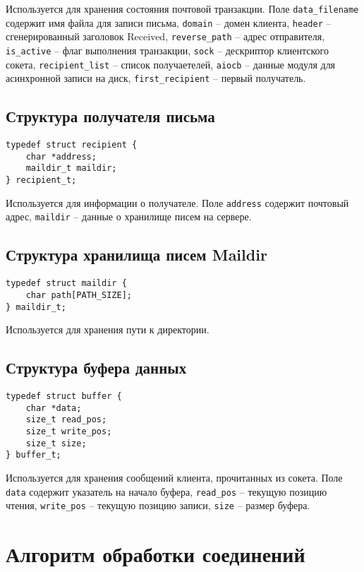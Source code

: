 Используется для хранения состояния почтовой транзакции.
Поле \verb;data_filename; содержит имя файла для записи письма,
\verb;domain; -- домен клиента,
\verb;header; -- сгенерированный заголовок Received,
\verb;reverse_path; -- адрес отправителя,
\verb;is_active; -- флаг выполнения транзакции,
\verb;sock; -- дескриптор клиентского сокета,
\verb;recipient_list; -- список получаетелей,
\verb;aiocb; -- данные модуля для асинхронной записи на диск,
\verb;first_recipient; -- первый получатель.

\subsection{Структура получателя письма}

\begin{verbatim}
typedef struct recipient {
    char *address;
    maildir_t maildir;
} recipient_t;
\end{verbatim}

Используется для информации о получателе.
Поле \verb;address; содержит почтовый адрес,
\verb;maildir; -- данные о хранилище писем на сервере.

\subsection{Структура хранилища писем Maildir}

\begin{verbatim}
typedef struct maildir {
    char path[PATH_SIZE];
} maildir_t;
\end{verbatim}

Используется для хранения пути к директории.

\subsection{Структура буфера данных}

\begin{verbatim}
typedef struct buffer {
    char *data;
    size_t read_pos;
    size_t write_pos;
    size_t size;
} buffer_t;
\end{verbatim}

Используется для хранения сообщений клиента, прочитанных из сокета.
Поле \verb;data; содержит указатель на начало буфера,
\verb;read_pos; -- текущую позицию чтения,
\verb;write_pos; -- текущую позицию записи,
\verb;size; -- размер буфера.

\section{Алгоритм обработки соединений}

